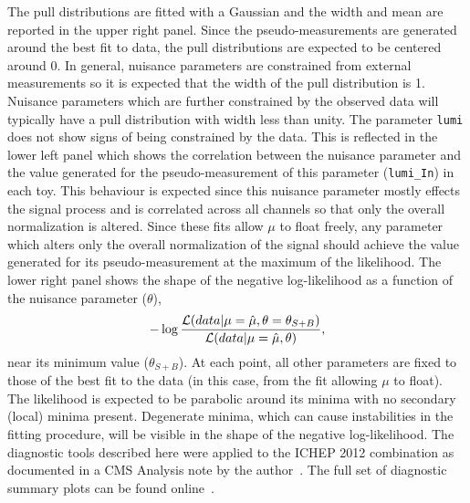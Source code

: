The pull distributions are fitted with a Gaussian and the width and mean 
are reported in the upper right panel. Since the pseudo-measurements 
are generated around the best fit to data, the pull distributions
are expected to be centered around 0. In general, nuisance parameters
are constrained from external measurements so it is expected that the 
width of the pull distribution is 1. Nuisance parameters which are further
constrained by the observed data will typically have a pull distribution with width less
than unity. The parameter \texttt{lumi} does not show signs of being constrained
by the data. 
This is reflected in the lower left panel which shows the correlation between
the nuisance parameter and the value generated for the pseudo-measurement
of this parameter (\texttt{lumi\_In}) in each toy.
This behaviour is expected since this nuisance parameter mostly effects the signal process and 
is correlated across all channels so that only the overall
normalization is altered. Since these fits allow $\mu$ to float freely, 
any parameter which alters only the overall normalization of the signal should 
achieve the value generated for its pseudo-measurement at the maximum of the likelihood. 
The lower right panel shows the shape of the negative log-likelihood
as a function of the nuisance parameter ($\theta$),
\begin{equation}
-\log \frac{\displaystyle \mathcal{L}(data|\mu=\hat{\mu},\theta=\theta_{S+B})}
		 {\displaystyle \mathcal{L}(data|\mu=\hat{\mu},\theta)},
\end{equation}
near its minimum value ($\theta_{S+B}$).
At each point, all other parameters are fixed 
to those of the best fit to the data (in this case, from the fit allowing $\mu$ to float).
The likelihood is expected to be parabolic around its minima with no secondary (local) 
minima present.
Degenerate minima, which can cause instabilities in the fitting procedure, will be visible in the 
shape of the negative log-likelihood. The diagnostic tools described here were applied
to the ICHEP 2012 combination as documented in a CMS Analysis note by the 
author~\citep{AN-12-317}. The full set of diagnostic summary plots can be found 
online~\citep{onlinediag}.

